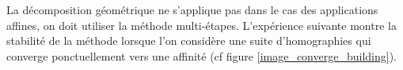 
La décomposition géométrique ne s'applique pas dans le cas des applications affines,  on doit utiliser la méthode multi-étapes. L'expérience suivante montre la stabilité de la méthode lorsque l'on considère une suite d'homographies qui converge ponctuellement vers une affinité (cf figure \ref{image_converge_building}).

\begin{figure}[h!]
		\centering
\end{figure}
